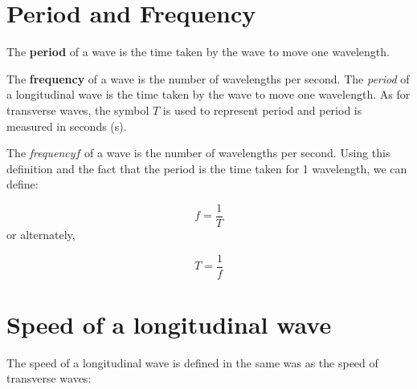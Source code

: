             \section{Period and Frequency}
            \nopagebreak
            \par
{} { \label{m38782*meaningfhsst!!!underscore!!!id143}
       The \textbf{period} of a wave is the time taken by the wave to move one wavelength.
         } 
\par
  { \label{m38782*meaningfhsst!!!underscore!!!id146}
        The \textbf{frequency} of a wave is the number of wavelengths per second.  
         } 
        \label{m38782*id292523}The \textsl{period} of a longitudinal wave is the time taken by the wave to move one wavelength. As for transverse waves, the symbol $T$ is used to represent period and period is measured in seconds (s).\par 
        \label{m38782*id292542}The \textsl{frequency}$f$ of a wave is the number of wavelengths per second. Using this definition and the fact that the period is the time taken for 1 wavelength, we can define:\par 
        \label{m38782*id291687}\nopagebreak\noindent{}
          
    \begin{equation}
    f=\frac{1}{T}
      \end{equation}
        \label{m38782*id291706}or alternately,\par 
        \label{m38782*id292764}\nopagebreak\noindent{}
    \begin{equation}
    T=\frac{1}{f}
      \end{equation}
      \label{m38782*uid11}
            \section{Speed of a longitudinal wave}
            \nopagebreak
            \label{m38782*id292794}The speed of a longitudinal wave is defined in the same was as the speed of transverse waves:\par 
%           

